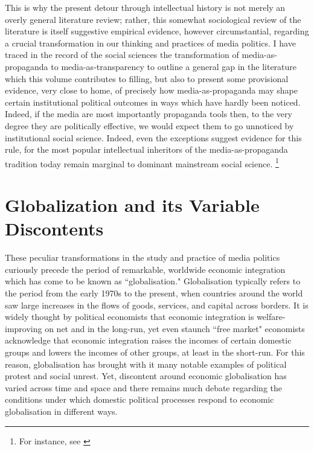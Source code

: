 \documentclass[12pt]{report}
\begin{document}
This is why the present detour through intellectual history is not
merely an overly general literature review; rather, this somewhat
sociological review of the literature is itself suggestive empirical
evidence, however circumstantial, regarding a crucial transformation
in our thinking and practices of media politics. I have traced in
the record of the social sciences the transformation of media-as-propaganda
to media-as-transparency to outline a general gap in the literature
which this volume contributes to filling, but also to present some
provisional evidence, very close to home, of precisely how media-as-propaganda
may shape certain institutional political outcomes in ways which have
hardly been noticed. Indeed, if the media are most importantly propaganda
tools then, to the very degree they are politically effective, we
would expect them to go unnoticed by institutional social science.
Indeed, even the exceptions suggest evidence for this rule, for the
most popular intellectual inheritors of the media-as-propaganda tradition
today remain marginal to dominant mainstream social science.%
\footnote{For instance, see \citealt{Herman:1988ta,mcchesney2000rich,luhmann2000reality} %
}


\section{Globalization and its Variable Discontents}

These peculiar transformations in the study and practice of media
politics curiously precede the period of remarkable, worldwide economic
integration which has come to be known as ``globalisation."
Globalisation typically refers to the period from the early 1970s
to the present, when countries around the world saw large increases
in the flows of goods, services, and capital across borders. It is
widely thought by political economists that economic integration is
welfare-improving on net and in the long-run, yet even staunch ``free
market" economists acknowledge that economic integration
raises the incomes of certain domestic groups and lowers the incomes
of other groups, at least in the short-run. For this reason, globalisation
has brought with it many notable examples of political protest and
social unrest. Yet, discontent around economic globalisation has varied
across time and space and there remains much debate regarding the
conditions under which domestic political processes respond to economic
globalisation in different ways.
\end{document}
